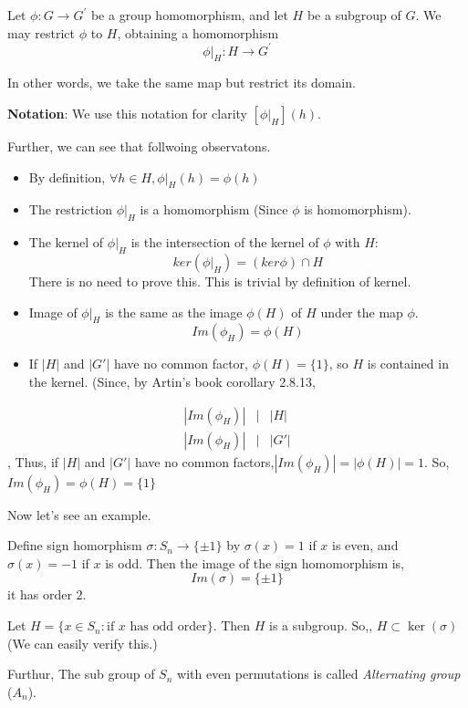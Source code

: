 \documentclass[
]{book}
\providecommand{\tightlist}{%
  \setlength{\itemsep}{0pt}\setlength{\parskip}{0pt}}
\begin{document}
\leavevmode{}%
Let \(\phi: G \rightarrow G^\prime\) be a group homomorphism, and let
\(H\) be a subgroup of \(G\). We may restrict \(\phi\) to \(H\),
obtaining a homomorphism \[\phi|_H: H \rightarrow G^\prime\]

In other words, we take the same map but restrict its domain.

\textbf{Notation}: We use this notation for clarity \([\phi|_H](h)\).

Further, we can see that follwoing observatons.

\begin{itemize}
\tightlist
\item
  By definition, \(\forall h\in H,\phi|_H(h) = \phi(h)\)
\item
  The restriction \(\phi|_H\) is a homomorphism (Since \(\phi\) is
  homomorphism).
\item
  The kernel of \(\phi|_H\) is the intersection of the kernel of
  \(\phi\) with \(H\): \[ker(\phi|_H) = (ker\phi) \cap H\] There is no
  need to prove this. This is trivial by definition of kernel.
\item
  Image of \(\phi|_H\) is the same as the image \(\phi(H)\) of \(H\)
  under the map \(\phi\). \[Im(\phi_H)=\phi(H)\]
\item
  If \(|H|\) and \(|G'|\) have no common factor, \(\phi(H) = \{1\}\), so
  \(H\) is contained in the kernel. (Since, by Artin's book corollary
  2.8.13,
\end{itemize}

\begin{eqnarray}
|Im(\phi_H)|&\biggr |&|H|\\
|Im(\phi_H)|&\biggr |& |G'|
\end{eqnarray}, Thus, if \(|H|\) and \(|G'|\) have no common
factors,\(|Im(\phi_H)|=|\phi(H)| =1.\) So, \(Im(\phi_H)=\phi(H)= \{1\}\)

Now let's see an example.

\leavevmode{}%
Define sign homorphism \(\sigma: S_n \to \{\pm 1\}\) by \(\sigma(x)=1\)
if \(x\) is even, and \(\sigma (x)=−1\) if \(x\) is odd. Then the image
of the sign homomorphism is, \[Im(\sigma)=\{\pm 1\}\] it has order
\(2\).

Let \(H=\{x \in S_n : \text{if $x$ has odd order}\}\). Then \(H\) is a
subgroup. So,, \(H \subset \ker(\sigma)\) (We can easily verify this.)

Furthur, The sub group of \(S_n\) with even permutations is called
\emph{Alternating group} (\(A_n\)).
\end{document}
